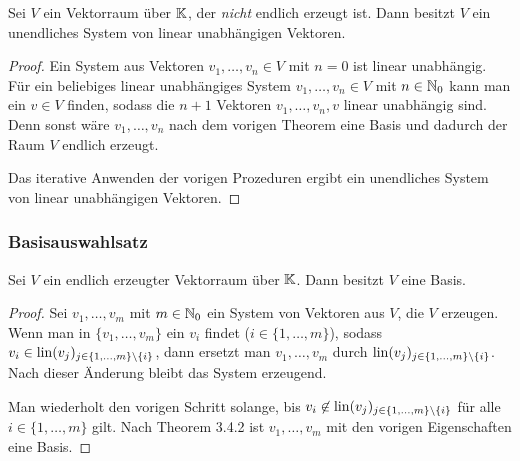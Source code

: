 \begin{klr}
	Sei $ V $ ein Vektorraum über $ \mathbb K $, der \emph{nicht} endlich erzeugt ist. Dann besitzt $ V $ ein unendliches System von linear unabhängigen Vektoren.
\end{klr}
\begin{proof}
	Ein System aus Vektoren $ v_1, \ldots, v_n \in V $ mit $ n = 0 $ ist linear unabhängig. Für ein beliebiges linear unabhängiges System $ v_1, \ldots, v_n \in V $ mit $ n \in \mathbb N_0 $ kann man ein $ v \in V $ finden, sodass die $ n+1 $ Vektoren $ v_1, \ldots, v_n, v $ linear unabhängig sind. Denn sonst wäre $ v_1, \ldots, v_n $ nach dem vorigen Theorem eine Basis und dadurch der Raum $ V $ endlich erzeugt.
	
	Das iterative Anwenden der vorigen Prozeduren ergibt ein unendliches System von linear unabhängigen Vektoren.
\end{proof}

\subsubsection{Basisauswahlsatz}

\begin{thm}
	Sei $ V $ ein endlich erzeugter Vektorraum über $ \mathbb K $. Dann besitzt $ V $ eine Basis.
\end{thm}
\begin{proof}
	Sei $ v_1, \ldots, v_m $ mit $ m \in \mathbb N_0 $ ein System von Vektoren aus $ V $, die $ V $ erzeugen. Wenn man in $ \{ v_1, \ldots, v_m \} $ ein $ v_i $ findet ($ i \in \{ 1, \ldots, m \} $), sodass $ v_i \in \operatorname{lin}(v_j)_{j \in \{ 1, \ldots, m \}\setminus\{ i \}} $, dann ersetzt man $ v_1, \ldots, v_m $ durch $ \operatorname{lin}(v_j)_{j \in \{ 1, \ldots, m \}\setminus\{ i \}} $. Nach dieser Änderung bleibt das System erzeugend.
	
	Man wiederholt den vorigen Schritt solange, bis $ v_i \not\in \operatorname{lin}(v_j)_{j \in \{ 1, \ldots, m \}\setminus\{ i \}} $ für alle $ i \in \{ 1, \ldots, m \} $ gilt. Nach Theorem 3.4.2 ist $ v_1, \ldots, v_m $ mit den vorigen Eigenschaften eine Basis.
\end{proof}

